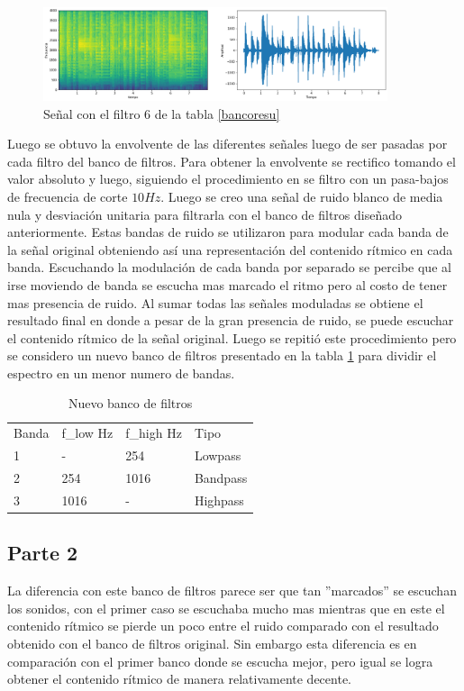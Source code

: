 \documentclass[a4paper]{article}
\begin{document}
\begin{figure}[h!]
\centering
\includegraphics[width=0.9\textwidth]{highpass.png}
\caption{Señal con el filtro 6 de la tabla \ref{bancoresu}}
\label{high}
\end{figure}

\newline
Luego se obtuvo la envolvente de las diferentes señales luego de ser pasadas por cada filtro del banco de filtros. Para obtener la envolvente se rectifico tomando el valor absoluto y luego, siguiendo el procedimiento en \cite{Scheirer} se filtro con un pasa-bajos de frecuencia de corte $10Hz$.
\newline
Luego se creo una señal de ruido blanco de media nula y desviación unitaria para filtrarla con el banco de filtros diseñado anteriormente. Estas bandas de ruido se utilizaron para modular cada banda de la señal original obteniendo así una representación del contenido rítmico en cada banda. Escuchando la modulación de cada banda por separado se percibe que al irse moviendo de banda se escucha mas marcado el ritmo pero al costo de tener mas presencia de ruido. 
\newline
Al sumar todas las señales moduladas se obtiene el resultado final en donde a pesar de la gran presencia de ruido, se puede escuchar el contenido rítmico de la señal original.
\newline
Luego se repitió este procedimiento pero se considero un nuevo banco de filtros presentado en la tabla \ref{papas} para dividir el espectro en un menor numero de bandas.
\begin{table}[h]
\centering
\begin{tabular}{llll}
Banda & f\_low Hz & f\_high Hz & Tipo \\
1 & - & 254 & Lowpass \\
2 & 254 & 1016 & Bandpass \\
3 & 1016 & - & Highpass
\end{tabular}
\caption{Nuevo banco de filtros}
\label{papas}

\end{table}

\subsection{Parte 2}
\newline 
La diferencia con este banco de filtros parece ser que tan ''marcados'' se escuchan los sonidos, con el primer caso se escuchaba mucho mas mientras que en este el contenido rítmico se pierde un poco entre el ruido comparado con el resultado obtenido con el banco de filtros original. Sin embargo esta diferencia es en comparación con el primer banco donde se escucha mejor, pero igual se logra obtener el contenido rítmico de manera relativamente decente. 
\end{document}
